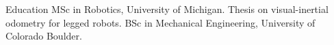 \begin{rubric}{Education}
\entry*[2014--2016]
  MSc in Robotics, University of Michigan. Thesis on visual-inertial
  odometry for legged robots.
\entry*[2010--2014]
  BSc in Mechanical Engineering, University of Colorado Boulder.
\end{rubric}
